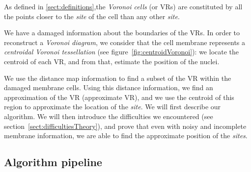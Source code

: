 As defined in \ref{sect:definitions},the \emph{Voronoi cells} (or VRs) are constituted by all the points closer to the \emph{site} of the cell than any other \emph{site}.

We have a damaged information about the boundaries of the VRs. In order to reconstruct a \emph{Voronoi diagram},
 we consider that the cell membrane represents a \emph{centroidal Voronoi tessellation} (see figure~\ref{fig:centroidVoronoi}): we locate the centroid of each VR, and from that, estimate the position of the nuclei.
 
We use the distance map information to find a subset of the VR within the damaged membrane cells.
Using this distance information, we find an approximation of the VR (approximate VR), and we use the centroid of this region to approximate the location of the \emph{site}.
We will first describe our algorithm. We will then introduce the difficulties we encountered (see section~\ref{sect:difficultiesTheory}), and prove that even with noisy and incomplete membrane information, we are able to find the approximate position of the \emph{sites}.


\subsection{Algorithm pipeline}

